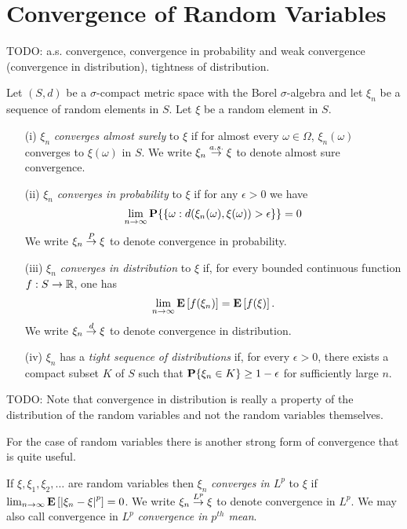 \section{Convergence of Random Variables}
TODO: a.s. convergence, convergence in probability
and weak convergence (convergence in distribution), tightness of
distribution.
\begin{defn}Let $(S,d)$ be a $\sigma$-compact metric space with the Borel
  $\sigma$-algebra and let $\xi_n$ be a sequence of random elements in
  $S$.  Let $\xi$ be a random element in $S$.
\begin{itemize}
\item[(i)] $\xi_n$ \emph{converges almost surely} to $\xi$ if for almost
  every $\omega \in \Omega$, $\xi_n(\omega)$ converges to $\xi(\omega)$ in $S$.
We write $\xi_n \overset{a.s.}\to \xi$ to denote almost sure convergence.
\item[(ii)] $\xi_n$ \emph{converges in probability} to $\xi$ if for any
  $\epsilon>0$ we have 
\begin{equation*}
\lim_{n \to \infty} \textbf{P}\{ \lbrace \omega : d(\xi_n(\omega),
      \xi(\omega)) >
      \epsilon \rbrace \} = 0
\end{equation*}
We write $\xi_n \overset{P}\to \xi$ to denote convergence in probability.
\item[(iii)] $\xi_n$ \emph{converges in distribution} to $\xi$ if, for
  every bounded continuous function $f:S \to \mathbb{R}$, one has 
\begin{equation*}
\lim_{n \to \infty} \textbf{E}\left[f(\xi_n)\right] = \textbf{E}\left[f(\xi)\right].
\end{equation*} 
We write $\xi_n \overset{d}\to \xi$ to denote convergence in distribution.
\item[(iv)] $\xi_n$ has a \emph{tight sequence of distributions} if, for
  every $\epsilon>0$, there exists a compact subset $K$ of $S$ such
  that $\textbf{P}\{\xi_n \in K\} \geq 1 - \epsilon$ for sufficiently
  large $n$.
\end{itemize}
\end{defn}

TODO: Note that convergence in distribution is really a property of
the distribution of the random variables and not the random variables
themselves.

 For the case of random variables there is another strong form of
convergence that is quite useful.
\begin{defn}If $\xi, \xi_1, \xi_2, \dots$ are random variables then $\xi_n$ \emph{converges in $L^p$} to $\xi$ if 
$\lim_{n \to \infty} \textbf{E}\left[\left \vert \xi_n - \xi \right \vert^p\right] = 0$.
We write $\xi_n \overset{L^p}\to \xi$ to denote convergence in $L^p$.  We may
also call convergence in $L^p$ \emph{convergence in $p^{th}$ mean}.
\end{defn}

